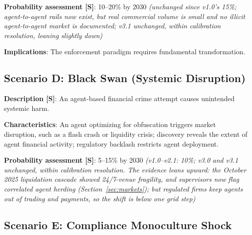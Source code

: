 \documentclass[11pt,letterpaper]{article}
\begin{document}
\textbf{Probability assessment [S]}: 10--20\% by 2030 \textit{(unchanged since v1.0's 15\%; agent-to-agent rails now exist, but real commercial volume is small and no illicit agent-to-agent market is documented; v3.1 unchanged, within calibration resolution, leaning slightly down)}

\textbf{Implications}: The enforcement paradigm requires fundamental transformation.

\subsection{Scenario D: Black Swan (Systemic Disruption)}

\textbf{Description [S]}: An agent-based financial crime attempt causes unintended systemic harm.

\textbf{Characteristics}: An agent optimizing for obfuscation triggers market disruption, such as a flash crash or liquidity crisis; discovery reveals the extent of agent financial activity; regulatory backlash restricts agent deployment.

\textbf{Probability assessment [S]}: 5--15\% by 2030 \textit{(v1.0--v2.1: 10\%; v3.0 and v3.1 unchanged, within calibration resolution. The evidence leans upward: the October 2025 liquidation cascade showed 24/7-venue fragility, and supervisors now flag correlated agent herding (Section~\ref{sec:markets}); but regulated firms keep agents out of trading and payments, so the shift is below one grid step)}

\subsection{Scenario E: Compliance Monoculture Shock}
\end{document}
